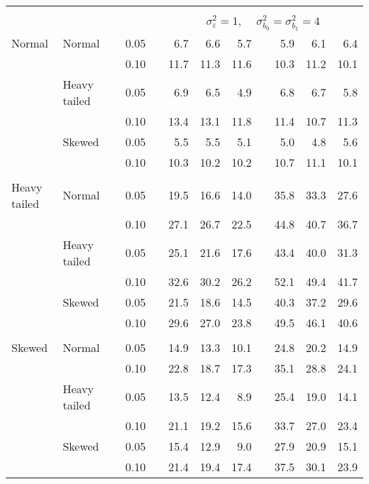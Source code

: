 \begin{table}[ht]
\begin{scriptsize}
\begin{tabular}{ll p{.1cm} c p{.1cm} rrr p{.1cm} rrr}
&&&&&&&&&&&\\
& && && \multicolumn{7}{c}{$\sigma_{\varepsilon}^2 = 1$, \ \ $\sigma_{b_0}^2 = \sigma_{b_1}^2 = 4$} \\ \cline{6-12}
\rowcolor{gray!20} Normal & Normal &  & 0.05 &  & 6.7 & 6.6 & 5.7 &  & 5.9 & 6.1 & 6.4 \\ 
\rowcolor{gray!20}    &  &  & 0.10 &  & 11.7 & 11.3 & 11.6 &  & 10.3 & 11.2 & 10.1 \\ 
\rowcolor{gray!20}    & Heavy tailed &  & 0.05 &  & 6.9 & 6.5 & 4.9 &  & 6.8 & 6.7 & 5.8 \\ 
\rowcolor{gray!20}    &  &  & 0.10 &  & 13.4 & 13.1 & 11.8 &  & 11.4 & 10.7 & 11.3 \\ 
\rowcolor{gray!20}    & Skewed &  & 0.05 &  & 5.5 & 5.5 & 5.1 &  & 5.0 & 4.8 & 5.6 \\ 
\rowcolor{gray!20}    &  &  & 0.10 &  & 10.3 & 10.2 & 10.2 &  & 10.7 & 11.1 & 10.1 \\ 
&&&&&&&&&&&\\
  Heavy tailed & Normal &  & 0.05 &  & 19.5 & 16.6 & 14.0 &  & 35.8 & 33.3 & 27.6 \\ 
  &  &  & 0.10 &  & 27.1 & 26.7 & 22.5 &  & 44.8 & 40.7 & 36.7 \\ 
  & Heavy tailed &  & 0.05 &  & 25.1 & 21.6 & 17.6 &  & 43.4 & 40.0 & 31.3 \\ 
  &&  & 0.10 &  & 32.6 & 30.2 & 26.2 &  & 52.1 & 49.4 & 41.7 \\ 
  & Skewed &  & 0.05 &  & 21.5 & 18.6 & 14.5 &  & 40.3 & 37.2 & 29.6 \\ 
  &  &  & 0.10 &  & 29.6 & 27.0 & 23.8 &  & 49.5 & 46.1 & 40.6 \\ 
&&&&&&&&&&&\\
  Skewed & Normal &  & 0.05 &  & 14.9 & 13.3 & 10.1 &  & 24.8 & 20.2 & 14.9 \\ 
   &  &  & 0.10 &  & 22.8 & 18.7 & 17.3 &  & 35.1 & 28.8 & 24.1 \\ 
   & Heavy tailed &  & 0.05 &  & 13.5 & 12.4 & 8.9 &  & 25.4 & 19.0 & 14.1 \\ 
   &  &  & 0.10 &  & 21.1 & 19.2 & 15.6 &  & 33.7 & 27.0 & 23.4 \\ 
   & Skewed &  & 0.05 &  & 15.4 & 12.9 & 9.0 &  & 27.9 & 20.9 & 15.1 \\ 
   &  &  & 0.10 &  & 21.4 & 19.4 & 17.4 &  & 37.5 & 30.1 & 23.9 \\ 

\hline
\end{tabular}
\end{scriptsize}
\end{table}




